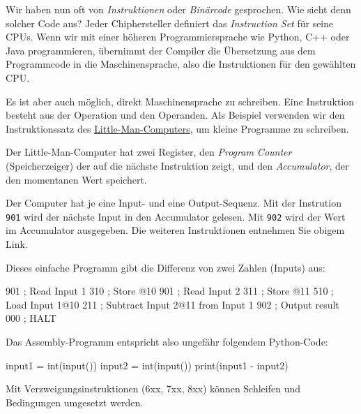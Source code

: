 Wir haben nun oft von \emph{Instruktionen} oder \emph{Binärcode} gesprochen. Wie sieht denn solcher Code aus? Jeder Chiphersteller definiert das \emph{Instruction Set} für seine CPUs. Wenn wir mit einer höheren Programmiersprache wie Python, C++ oder Java programmieren, übernimmt der Compiler die Übersetzung aus dem Programmcode in die Maschinensprache, also die Instruktionen für den gewählten CPU.

Es ist aber auch möglich, direkt Maschinensprache zu schreiben. Eine Instruktion besteht aus der Operation und den Operanden. Als Beispiel verwenden wir den Instruktionssatz des \href{https://en.wikipedia.org/wiki/Little_man_computer}{Little-Man-Computers}, um kleine Programme zu schreiben.

Der Little-Man-Computer hat zwei Register, den \emph{Program Counter} (Speicherzeiger) der auf die nächste Instruktion zeigt, und den \emph{Accumulator}, der den momentanen Wert speichert.

Der Computer hat je eine Input- und eine Output-Sequenz. Mit der Instrution \texttt{901} wird der nächste Input in den Accumulator gelesen. Mit \texttt{902} wird der Wert im Accumulator ausgegeben. Die weiteren Instruktionen entnehmen Sie obigem Link.

Dieses einfache Programm gibt die Differenz von zwei Zahlen (Inputs) aus:
\begin{assembly}
901  ; Read Input 1
310  ; Store @10
901  ; Read Input 2
311  ; Store @11
510  ; Load Input 1@10
211  ; Subtract Input 2@11 from Input 1
902  ; Output result
000  ; HALT
\end{assembly}

Das Assembly-Programm entspricht also ungefähr folgendem Python-Code:

\begin{python}
	input1 = int(input())
	input2 = int(input())
	print(input1 - input2)
\end{python}

Mit Verzweigungsinstruktionen (6xx, 7xx, 8xx) können Schleifen und Bedingungen umgesetzt werden. 

